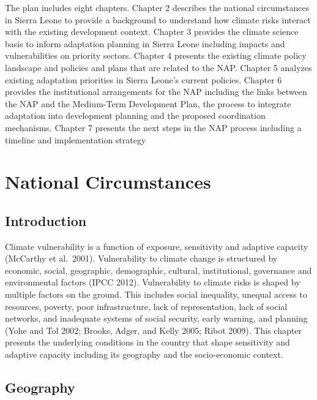 \documentclass[
]{book}
\begin{document}
The plan includes eight chapters. Chapter 2 describes the national circumstances in Sierra Leone to provide a background to understand how climate risks interact with the existing development context. Chapter 3 provides the climate science basis to inform adaptation planning in Sierra Leone including impacts and vulnerabilities on priority sectors. Chapter 4 presents the existing climate policy landscape and policies and plans that are related to the NAP. Chapter 5 analyzes existing adaptation priorities in Sierra Leone's current policies. Chapter 6 provides the institutional arrangements for the NAP including the links between the NAP and the Medium-Term Development Plan, the process to integrate adaptation into development planning and the proposed coordination mechanisms. Chapter 7 presents the next steps in the NAP process including a timeline and implementation strategy

\hypertarget{national-circumstances}{%
\chapter{National Circumstances}\label{national-circumstances}}

\hypertarget{introduction-1}{%
\section{Introduction}\label{introduction-1}}

Climate vulnerability is a function of exposure, sensitivity and adaptive capacity (McCarthy et al.~2001). Vulnerability to climate change is structured by economic, social, geographic, demographic, cultural, institutional, governance and environmental factors (IPCC 2012). Vulnerability to climate risks is shaped by multiple factors on the ground. This includes social inequality, unequal access to resources, poverty, poor infrastructure, lack of representation, lack of social networks, and inadequate systems of social security, early warning, and planning (Yohe and Tol 2002; Brooks, Adger, and Kelly 2005; Ribot 2009). This chapter presents the underlying conditions in the country that shape sensitivity and adaptive capacity including its geography and the socio-economic context.

\hypertarget{geography}{%
\section{Geography}\label{geography}}
\end{document}
